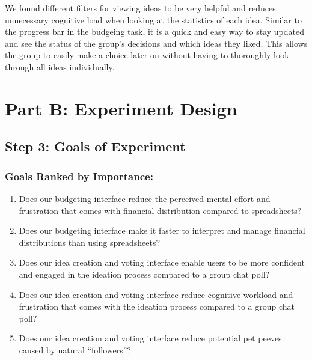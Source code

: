 \documentclass[12pt,a4paper]{article}
\begin{document}
\indent We found different filters for viewing ideas to be very helpful and reduces unnecessary cognitive load when looking at the statistics of each idea. Similar to the progress bar in the budgeing task, it is a quick and easy way to stay updated and see the status of the group’s decisions and which ideas they liked. This allows the group to easily make a choice later on without having to thoroughly look through all ideas individually.

\newpage

\section{Part B: Experiment Design}
\subsection{Step 3: Goals of Experiment}
\subsubsection{Goals Ranked by Importance:}
\begin{enumerate}
    \item{Does our budgeting interface reduce the perceived mental effort and frustration that comes with financial distribution compared to spreadsheets?}
    \item{Does our budgeting interface make it faster to interpret and manage financial distributions than using spreadsheets? }
    \item{Does our idea creation and voting interface enable users to be more confident and  engaged in the ideation process compared to a group chat poll?}
    \item{Does our idea creation and voting interface reduce cognitive workload and frustration that comes with the ideation process compared to a group chat poll?}
    \item{Does our idea creation and voting interface reduce potential pet peeves caused by natural “followers”?}
\end{enumerate}
\end{document}
